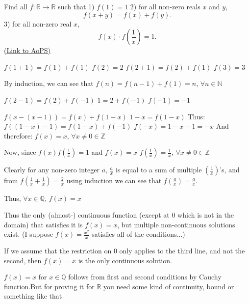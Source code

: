 \begin{problem}
	Find all $ f: \mathbb{R} \rightarrow  \mathbb{R}$ such that
1) $ f(1)=1$
2) for all non-zero reals $x$ and $y$, \[ f(x+y)=f(x)+f(y).\]
3) for all non-zero real $x$, \[ f(x)\cdot f\left( \frac 1x \right) =1.\]
	\flushright \href{https://artofproblemsolving.com/community/c6h282920}{(Link to AoPS)}
\end{problem}



\begin{solution}
	$ f(1+1)=f(1)+f(1)$
$ f(2)=2$
$ f(2+1)=f(2)+f(1)$
$ f(3)=3$

By induction, we can see that $ f(n)=f(n-1)+f(1)=n$, $ \forall n \in \mathbb{N}$

$ f(2-1)=f(2)+f(-1)$
$ 1=2+f(-1)$
$ f(-1)=-1$

$ f(x-(x-1))=f(x)+f(1-x)$
$ 1-x=f(1-x)$
Thus:
$ f((1-x)-1)=f(1-x)+f(-1)$
$ f(-x)=1-x-1=-x$
And therefore:
$ f(x)=x$,  $ \forall x \neq 0 \in \mathbb{Z}$

Now, since $ f(x)f\left (\frac{1}{x}\right )=1$ and $ f(x)=x$
$ f\left(\frac{1}{x}\right)=\frac{1}{x}$,  $ \forall x \neq 0 \in\mathbb{Z}$

Clearly for any non-zero integer $ a$, $ \frac{a}{x}$ is equal to a sum of multiple $ \left(\frac{1}{x}\right )$'s, and from $ f\left (\frac{1}{x}+\frac{1}{x}\right )=\frac{2}{x}$ using induction we can see that $ f\left (\frac{a}{x}\right )=\frac{a}{x}$.

Thus, $ \forall x\in\mathbb{Q}$, $ f(x)=x$

Thus the only (almost-) continuous function (except at 0 which is not in the domain) that satisfies it is $ f(x)=x$, but multiple non-continuous solutions exist. (I suppose $ f(x)=\frac{x^2}{x}$ satisfies all of the conditions...)

If we assume that the restriction on 0 only applies to the third line, and not the second, then $ f(x)=x$ is the only continuous solution.
\end{solution}



\begin{solution}
	$ f(x)=x$ for $ x \in \mathbb{Q}$ follows from first and second conditions by Cauchy function.But for proving it for $ \mathbb{R}$ you need some kind of continuity, bound  or something like that
\end{solution}



